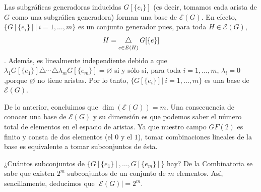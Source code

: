 Las subgráficas generadoras inducidas $G[\{e_{i}\}]$ (es decir, tomamos cada arista de $G$ como una subgráfica generadora) forman una base de $\mathcal{E}(G)$. En efecto, $\Big\{G[\{e_{i}\}]\Big|\:\! i = 1,\ldots, m\Big\}$ es un conjunto generador pues, para toda $H \in \mathcal{E}(G)$, $$H = \difsym_{e \in E(H)} G[\{e\}]$$. Además, es linealmente independiente debido a que $\lambda_{1}G[\{e_{1}\}] \triangle \cdots \triangle \lambda_{m}G[\{e_{m}\}] = \varnothing$ si y sólo si, para toda $i = 1, \ldots, m$, $\lambda_{i}=0$,porque $\varnothing$ no tiene aristas. Por lo tanto, $\Big\{G[\{e_{i}\}]\Big|\:\! i = 1,\ldots, m\Big\}$ es una base de $\mathcal{E}(G)$.

De lo anterior, concluimos que $\dim(\mathcal{E}(G)) = m$. Una consecuencia de conocer una base de $\mathcal{E}(G)$ y su dimensión es que podemos saber el número total de elementos en el espacio de aristas. Ya que nuestro campo $GF(2)$ es finito y consta de dos elementos (el $0$ y el $1$), tomar combinaciones lineales de la base es equivalente a tomar subconjuntos de ésta. 

¿Cuántos subconjuntos de $\Big\{G[\{e_{1}\}],\ldots, G[\{e_{m}\}]\Big\}$ hay? De la Combinatoria se sabe que existen $2^{m}$ subconjuntos de un conjunto de $m$ elementos. Así, sencillamente, deducimos que $|\mathcal{E}(G)| = 2^{m}$.

